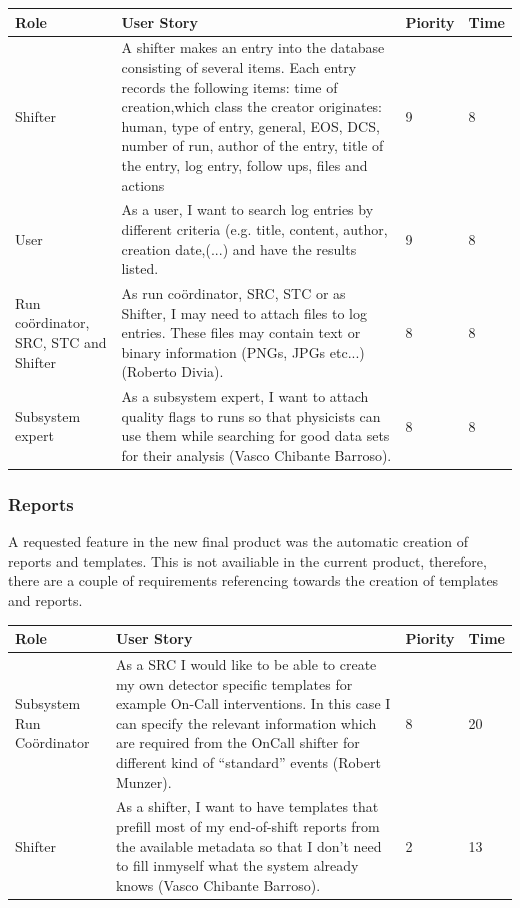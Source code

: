 \documentclass[paper=a4, fontsize=11pt,twoside]{scrartcl}	%
\begin{document}
\begin{longtable}{ | p{2cm} | p{8cm} | p{1.5cm} | l |}
\hline
Role & User Story & Piority & Time \\ \hline
Shifter &  A shifter makes an entry into the database consisting of several items. Each entry records the following items: time of creation,which class the creator originates: human, type of entry, general, EOS, DCS, number of run, author of the entry, title of the entry, log entry, follow ups, files and actions & 9 & 8 \\ \hline
User & As a user, I want to search log entries by different criteria (e.g. title, content, author, creation date,(...) and have the results listed. & 9 & 8 \\ \hline
Run coördinator, SRC, STC and Shifter& As run coördinator, SRC, STC or as Shifter, I may need to attach files to log entries. These files may contain text or binary information (PNGs, JPGs etc...) (Roberto Divia). & 8 & 8 \\ \hline
Subsystem expert & As a subsystem expert, I want to attach quality flags to runs so that
physicists can use them while searching for good data sets for their analysis (Vasco Chibante Barroso). & 8 & 8 \\ \hline
\end{longtable}


\subsubsection{Reports}
A requested feature in the new final product was the automatic creation of reports and templates. This is not availiable in the current product, therefore, there are a couple of requirements referencing towards the creation of templates and reports.
\begin{longtable}{ | p{2cm} | p{8cm} | p{1.5cm} | l |}
\hline
Role & User Story & Piority & Time \\ \hline
Subsystem Run Coördinator & As a SRC I would like to be able to create my own detector specific templates for example On-Call interventions. In this case I can specify the relevant information which are required from the OnCall shifter for different kind of “standard” events (Robert Munzer). & 8 & 20 \\ \hline
Shifter &  As a shifter, I want to have templates that prefill most of my end-of-shift reports from the available metadata so that I don’t need to fill inmyself what the system already knows (Vasco Chibante Barroso). & 2 & 13 \\ \hline
\end{longtable}
\end{document}
